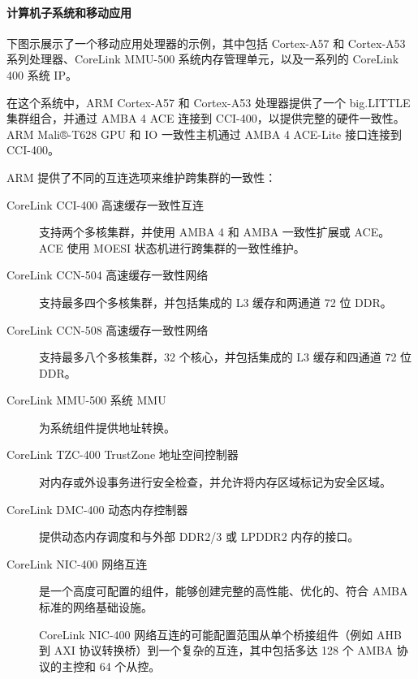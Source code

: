 \paragraph{计算机子系统和移动应用}

下图示展示了一个移动应用处理器的示例，其中包括 Cortex-A57 和 Cortex-A53 系列处理器、CoreLink MMU-500 系统内存管理单元，以及一系列的 CoreLink 400 系统 IP。


在这个系统中，ARM
Cortex-A57 和 Cortex-A53 处理器提供了一个 big.LITTLE 集群组合，并通过 AMBA 4
ACE 连接到 CCI-400，以提供完整的硬件一致性。
ARM Mali®-T628
GPU 和 IO 一致性主机通过 AMBA 4 ACE-Lite 接口连接到 CCI-400。

ARM 提供了不同的互连选项来维护跨集群的一致性：

\begin{description}
  \item [CoreLink CCI-400 高速缓存一致性互连] \hfill
    支持两个多核集群，并使用 AMBA
    4 和 AMBA 一致性扩展或 ACE。
    ACE 使用 MOESI 状态机进行跨集群的一致性维护。
  \item [CoreLink CCN-504 高速缓存一致性网络] \hfill
    支持最多四个多核集群，并包括集成的 L3 缓存和两通道 72 位 DDR。
  \item [CoreLink CCN-508 高速缓存一致性网络] \hfill
    支持最多八个多核集群，32 个核心，并包括集成的 L3 缓存和四通道 72 位 DDR。
  \item [CoreLink MMU-500 系统 MMU] \hfill
    为系统组件提供地址转换。
  \item [CoreLink TZC-400 TrustZone 地址空间控制器] \hfill
    对内存或外设事务进行安全检查，并允许将内存区域标记为安全区域。
  \item [CoreLink DMC-400 动态内存控制器] \hfill
    提供动态内存调度和与外部 DDR2/3 或 LPDDR2 内存的接口。
  \item [CoreLink NIC-400 网络互连] \hfill
    是一个高度可配置的组件，能够创建完整的高性能、优化的、符合 AMBA 标准的网络基础设施。

    CoreLink NIC-400 网络互连的可能配置范围从单个桥接组件（例如 AHB 到 AXI 协议转换桥）到一个复杂的互连，其中包括多达 128 个 AMBA 协议的主控和 64 个从控。
\end{description}
